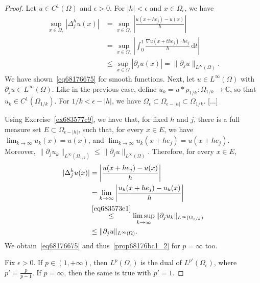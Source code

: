 \documentclass[a4paper,9pt]{amsart}
\newcommand{\C}{\mathbb{C}}	%
\newcommand{\did}{\,\mathrm{d}}	%
\newcommand{\de}{\partial}		%
\newcommand{\THEN}{\Rightarrow}	%
\newcommand{\grad}{\nabla}
\theoremstyle{plain}
\theoremstyle{definition}
\theoremstyle{remark}
\begin{document}
\begin{proof}
	\framebox{$\ref{prop68176bc1_1}\THEN\ref{prop68176bc1_2}$: case $p=\infty$.}
	Let $u\in C^1(\Omega)$ and $\epsilon>0$.
	For $|h|<\epsilon$ and $x\in\Omega_\epsilon$, we have
	\begin{equation}\label{eq683573e1}
	\begin{aligned}
		\sup_{x\in\Omega_\epsilon} |\Delta^h_ju(x)|
		&= \sup_{x\in\Omega_\epsilon} \left| \frac{u(x+he_j) - u(x)}{h} \right| \\
		&= \sup_{x\in\Omega_\epsilon} \left| \int_0^1 \frac{\grad u(x+the_j) \cdot he_j }{h} \did t \right| \\
		&\le \sup_{x\in\Omega} |\de_j u(x)| 
		= \|\de_j u\|_{L^\infty(\Omega)} .
	\end{aligned}
	\end{equation}
	We have shown~\eqref{eq68176675} for smooth functions.
	Next, let $u\in L^\infty(\Omega)$ with $\de_ju\in L^\infty(\Omega)$.
	Like in the previous case, define $u_k = u*\rho_{1/k}:\Omega_{1/k}\to\C$, so that $u_k\in C^1(\Omega_{1/k})$.
	For $1/k<\epsilon-|h|$, we have $\Omega_\epsilon\subset \Omega_{\epsilon-|h|}\subset \Omega_{1/k}$.
	[...]
	
	Using Exercise~\ref{ex683577c9}, we have that, for fixed $h$ and $j$, there is a full measure set $E\subset\Omega_{\epsilon-|h|}$, 
	such that, for every $x\in E$, we have
	$\lim_{k\to\infty} u_k(x) = u(x)$, and $\lim_{k\to\infty} u_k(x+he_j) = u(x+he_j)$. 
	Moreover, $\|\de_ju_k\|_{L^\infty(\Omega_{1/k})} \le \|\de_j u\|_{L^\infty(\Omega)}$.
	Therefore, for every $x\in E$,
	\begin{equation}
	\begin{aligned}
		|\Delta^h_ju(x)|
		&= \left| \frac{u(x+he_j) - u(x)}{h} \right| \\
		&= \lim_{k\to\infty} \left| \frac{u_k(x+he_j) - u_k(x)}{h} \right| \\
		&\overset{\eqref{eq683573e1}}\le \limsup_{k\to\infty} \|\de_j u_k\|_{L^\infty(\Omega_{1/k})} \\
		&\le  \|\de_j u\|_{L^\infty(\Omega)} .
	\end{aligned}
	\end{equation}
	We obtain~\eqref{eq68176675} and thus~\ref{prop68176bc1_2} for $p=\infty$ too.
	
	\framebox{$\ref{prop68176bc1_2}\THEN\ref{prop68176bc1_1}$.}
	Fix $\epsilon>0$.
	If $p\in(1,+\infty)$, then $L^p(\Omega_\epsilon)$ is the dual of $L^{p'}(\Omega_\epsilon)$, where $p'=\frac{p}{p-1}$.
	If $p=\infty$, then the same is true with $p'=1$.
	

\end{proof}
\end{document}
